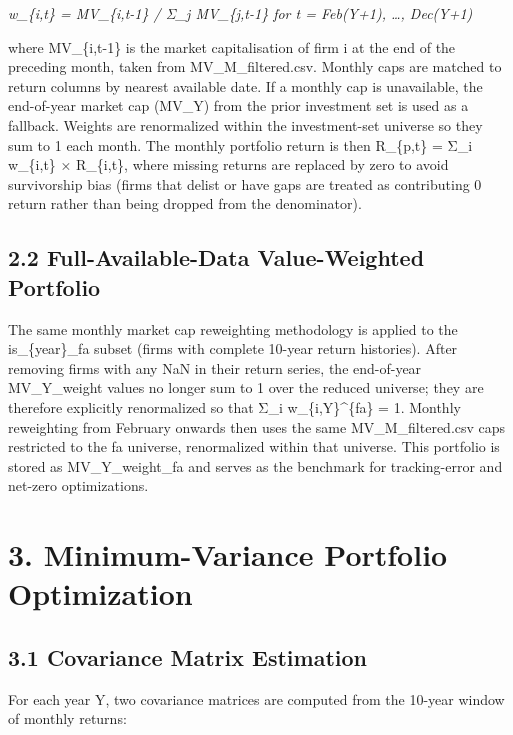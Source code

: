 \documentclass[
  11pt,
]{article}
\begin{document}
\emph{w\_\{i,t\} = MV\_\{i,t-1\} / Σ\_j MV\_\{j,t-1\} for t = Feb(Y+1),
\ldots, Dec(Y+1)}

where MV\_\{i,t-1\} is the market capitalisation of firm i at the end of
the preceding month, taken from MV\_M\_filtered.csv. Monthly caps are
matched to return columns by nearest available date. If a monthly cap is
unavailable, the end-of-year market cap (MV\_Y) from the prior
investment set is used as a fallback. Weights are renormalized within
the investment-set universe so they sum to 1 each month. The monthly
portfolio return is then R\_\{p,t\} = Σ\_i w\_\{i,t\} × R\_\{i,t\},
where missing returns are replaced by zero to avoid survivorship bias
(firms that delist or have gaps are treated as contributing 0 return
rather than being dropped from the denominator).

\hypertarget{full-available-data-value-weighted-portfolio}{%
\subsection{2.2 Full-Available-Data Value-Weighted
Portfolio}\label{full-available-data-value-weighted-portfolio}}

The same monthly market cap reweighting methodology is applied to the
is\_\{year\}\_fa subset (firms with complete 10-year return histories).
After removing firms with any NaN in their return series, the
end-of-year MV\_Y\_weight values no longer sum to 1 over the reduced
universe; they are therefore explicitly renormalized so that Σ\_i
w\_\{i,Y\}\^{}\{fa\} = 1. Monthly reweighting from February onwards then
uses the same MV\_M\_filtered.csv caps restricted to the fa universe,
renormalized within that universe. This portfolio is stored as
MV\_Y\_weight\_fa and serves as the benchmark for tracking-error and
net-zero optimizations.

\hypertarget{minimum-variance-portfolio-optimization}{%
\section{3. Minimum-Variance Portfolio
Optimization}\label{minimum-variance-portfolio-optimization}}

\hypertarget{covariance-matrix-estimation}{%
\subsection{3.1 Covariance Matrix
Estimation}\label{covariance-matrix-estimation}}

For each year Y, two covariance matrices are computed from the 10-year
window of monthly returns:
\end{document}
